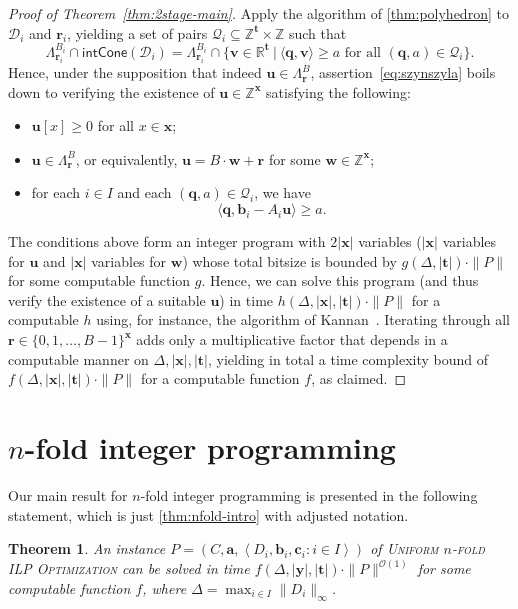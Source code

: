 \documentclass{article}
\newtheorem{theorem}{Theorem}\newtheorem{lemma}[theorem]{Lemma}\newtheorem{proposition}[theorem]{Proposition}\newtheorem{corollary}[theorem]{Corollary}\newtheorem{definition}[theorem]{Definition}\newtheorem{claim}[theorem]{Claim}\newtheorem{remark}[theorem]{Remark}\newtheorem{observation}[theorem]{Observation}\newtheorem{conjecture}[theorem]{Conjecture}\newtheorem{example}[theorem]{Example}
\renewcommand{\geq}{\geqslant}
\newcommand{\Dd}{\mathcal{D}}
\newcommand{\Z}{\mathbb{Z}}
\newcommand{\R}{\mathbb{R}}
\newcommand{\tup}[1]{{\mathbf{#1}}}
\newcommand{\xx}{\tup x}
\newcommand{\ww}{\tup w}
\newcommand{\yy}{\tup y}
\newcommand{\tv}{\tup t}
\newcommand{\av}{\tup a}
\newcommand{\bb}{\tup b}
\newcommand{\cc}{\tup c}
\newcommand{\rr}{\tup r}
\newcommand{\qq}{\tup q}
\newcommand{\uu}{\tup u}
\newcommand{\myvv}{\tup v} %
\newcommand{\mset}[1]{\left\langle #1\right\rangle}
\newcommand{\Oh}{{\mathcal{O}}}
\newcommand{\Qq}{\mathcal{Q}}
\newcommand{\sca}[2]{\langle #1,#2\rangle}
\newcommand{\nfoldOpt}{\textsc{$n$-fold ILP Optimization}}
\newcommand{\nfold}{$n$-fold}
\newcommand{\intcone}{\mathsf{intCone}}
\begin{document}
\begin{proof}[Proof of Theorem~\ref{thm:2stage-main}]
 Apply the algorithm of \cref{thm:polyhedron} to $\Dd_i$ and $\rr_i$, yielding a set of pairs $\Qq_i\subseteq \Z^\tv\times \Z$ such that
 $$\Lambda^{B_i}_{\rr_i}\cap \intcone(\Dd_i) = \Lambda^{B_i}_{\rr_i}\cap \{\myvv\in \R^\tv~|~\sca{\qq}{\myvv}\geq a\textrm{ for all }(\qq,a)\in \Qq_i\}.$$
 Hence, under the supposition that indeed $\uu\in \Lambda_\rr^B$, assertion~\cref{eq:szynszyla} boils down to verifying the existence of $\uu\in \Z^{\xx}$ satisfying the following:
 \begin{itemize}[nosep]
  \item $\uu[x]\geq 0$ for all $x\in \xx$;
  \item $\uu\in \Lambda_\rr^B$, or equivalently, $\uu=B\cdot \ww+\rr$ for some $\ww\in \Z^\xx$;
  \item for each $i\in I$ and each $(\qq,a)\in \Qq_i$, we have
  $$\sca{\qq}{\bb_i-A_i\uu}\geq a.$$
 \end{itemize}
 The conditions above form an integer program with $2|\xx|$ variables ($|\xx|$ variables for $\uu$ and $|\xx|$ variables for $\ww$) whose total bitsize is bounded by $g(\Delta,|\tv|)\cdot \|P\|$ for some computable function $g$. Hence, we can solve this program (and thus verify the existence of a suitable $\uu$) in time $h(\Delta,|\xx|,|\tv|)\cdot \|P\|$ for a computable $h$ using, for instance, the algorithm of Kannan~\cite{kannan1987minkowski}. Iterating through all $\rr\in \{0,1,\ldots,B-1\}^\xx$ adds only a multiplicative factor that depends in a computable manner on $\Delta,|\xx|,|\tv|$, yielding in total a time complexity bound of $f(\Delta,|\xx|,|\tv|)\cdot \|P\|$ for a computable function $f$, as claimed.
\end{proof}

\section{\texorpdfstring{\nfold{}}{n-fold} integer programming}

Our main result for \nfold{} integer programming is presented in the following statement, which is just \cref{thm:nfold-intro} with adjusted notation.


\begin{theorem}\label{thm:nfold-main}
An instance $P=(C,\av,\mset{D_i,\bb_i,\cc_i\colon i\in I})$ of {\textsc{Uniform}} \nfoldOpt{} can be solved in time $f(\Delta,|\yy|,|\tv|)\cdot \|P\|^{\Oh(1)}$ for some computable function $f$, where $\Delta=\max_{i\in I}\|D_i\|_\infty$.
\end{theorem}
\end{document}
